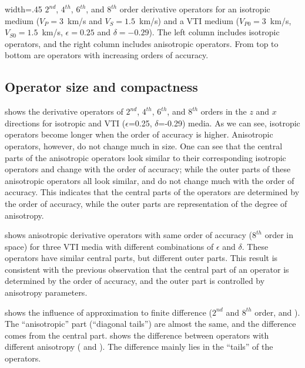 {width=.45\textwidth} { $2^{nd}$, $4^{th}$, $6^{th}$, and $8^{th}$
order derivative operators for an isotropic medium ($V_P=3$~km/s and
$V_S=1.5$~km/s) and a VTI medium ($V_{P0}=3$~km/s, $V_{S0}=1.5$~km/s,
$\epsilon=0.25$ and $\delta=-0.29$). The left column includes
isotropic operators, and the right column includes anisotropic
operators.  From top to bottom are operators with increasing orders of
accuracy.}


\subsection{Operator size and compactness}
 shows the derivative
operators of $2^{nd}$, $4^{th}$, $6^{th}$, and $8^{th}$ orders in the
$z$ and $x$ directions for isotropic and VTI ($\epsilon$=0.25,
$\delta$=-0.29) media. As we can see,
isotropic operators become longer when the order of accuracy is
higher. Anisotropic operators, however, do not change much in size. One
can see that the central parts of the anisotropic operators look similar
to their corresponding isotropic operators and change with the order
of accuracy; while the outer parts of these anisotropic operators all
look similar, and do not change much with the order of accuracy. This
indicates that the central parts of the operators are determined by
the order of accuracy, while the outer parts are representation of the
degree of anisotropy.

shows anisotropic derivative operators with 
same order of accuracy ($8^{th}$ order in space) for three VTI media
with different combinations of $\epsilon$ and $\delta$. These
operators have similar central parts, but different outer parts.  This
result is consistent with the previous observation that the central
part of an operator is determined by the order of accuracy, and the
outer part is controlled by anisotropy parameters. 

{ shows the influence of
approximation to finite difference ($2^{nd}$ and $8^{th}$
order,  and ). The ``anisotropic''
part (``diagonal tails'') are almost the same, and the difference comes from
the central part.   shows the difference
between operators with different anisotropy (
and ). The difference mainly lies in the ``tails''
of the operators.  }

